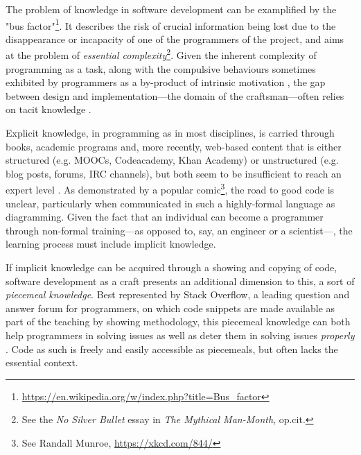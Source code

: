 The problem of knowledge in software development can be examplified by the "bus factor"\footnote{\url{https://en.wikipedia.org/w/index.php?title=Bus_factor}}. It describes the risk of crucial information being lost due to the disappearance or incapacity of one of the programmers of the project, and aims at the problem of \emph{essential complexity}\footnote{See the \emph{No Silver Bullet} essay in \emph{The Mythical Man-Month}, op.cit.}. Given the inherent complexity of programming as a task, along with the compulsive behaviours sometimes exhibited by programmers as a by-product of intrinsic motivation \citep{weizenbaum_computer_1976}, the gap between design and implementation---the domain of the craftsman---often relies on tacit knowledge \citep{collins_tacit_2010}.

Explicit knowledge, in programming as in most disciplines, is carried through books, academic programs and, more recently, web-based content that is either structured (e.g. MOOCs, Codeacademy, Khan Academy) or unstructured (e.g. blog posts, forums, IRC channels), but both seem to be insufficient to reach an expert level \citep{davies_models_1993}. As demonstrated by a popular comic\footnote{See Randall Munroe, \url{https://xkcd.com/844/}}, the road to good code is unclear, particularly when communicated in such a highly-formal language as diagramming. Given the fact that an individual can become a programmer through non-formal training---as opposed to, say, an engineer or a scientist---, the learning process must include implicit knowledge.

If implicit knowledge can be acquired through a showing and copying of code, software development as a craft presents an additional dimension to this, a sort of \emph{piecemeal knowledge}. Best represented by Stack Overflow, a leading question and answer forum for programmers, on which code snippets are made available as part of the teaching by showing methodology, this piecemeal knowledge can both help programmers in solving issues as well as deter them in solving issues \emph{properly} \citep{treude_understanding_2017}. Code as such is freely and easily accessible as piecemeals, but often lacks the essential context.

